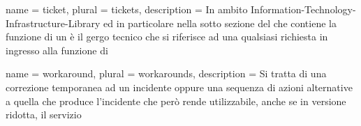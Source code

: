 {
	name		= {ticket},
	plural		= {tickets},
	description = {In ambito \ac{Information-Technology-Infrastructure-Library} ed in particolare nella sotto sezione del  che contiene la funzione di  un  è il gergo tecnico che si riferisce ad una qualsiasi richiesta in ingresso alla funzione di }
}

{
	name		= {workaround},
	plural		= {workarounds},
	description	= {Si tratta di una correzione temporanea ad un incidente oppure una sequenza di azioni alternative a quella che produce l'incidente che però rende utilizzabile, anche se in versione ridotta, il servizio}
}